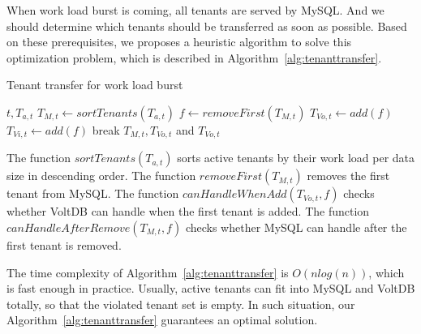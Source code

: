 \documentclass{article}
\begin{document}
When work load burst is coming, all tenants are served by MySQL. And we should determine which tenants should be transferred as soon as possible. Based on these prerequisites, we proposes a heuristic algorithm to solve this optimization problem, which is described in Algorithm~\ref{alg:tenanttransfer}.
\begin{algorithm}[h]
\caption{Tenant transfer for work load burst}
\label{alg:tenanttransfer}
    \begin{algorithmic}[1]
    \Require $t, T_{a, t}$
    \State $T_{M, t} \gets sortTenants(T_{a, t})$
    \State $f \gets removeFirst(T_{M, t})$
        \State $T_{Vo, t} \gets add(f)$
    \Else
        \State $T_{Vi, t} \gets add(f)$
    \EndIf
        \State break
    \EndIf
    \EndWhile
    \State
    \Ensure $T_{M, t}, T_{Vo, t}$ and $T_{Vo, t}$
    \end{algorithmic}
\end{algorithm}

The function $sortTenants(T_{a, t})$ sorts active tenants by their work load per data size in descending order. The function $removeFirst(T_{M, t})$ removes the first tenant from MySQL. The function $canHandleWhenAdd(T_{Vo, t}, f)$ checks whether VoltDB can handle when the first tenant is added. The function $canHandleAfterRemove(T_{M, t}, f)$ checks whether MySQL can handle after the first tenant is removed.

The time complexity of Algorithm~\ref{alg:tenanttransfer} is $O(nlog(n))$, which is fast enough in practice. Usually, active tenants can fit into MySQL and VoltDB totally, so that the violated tenant set is empty. In such situation, our Algorithm~\ref{alg:tenanttransfer} guarantees an optimal solution.
\end{document}

